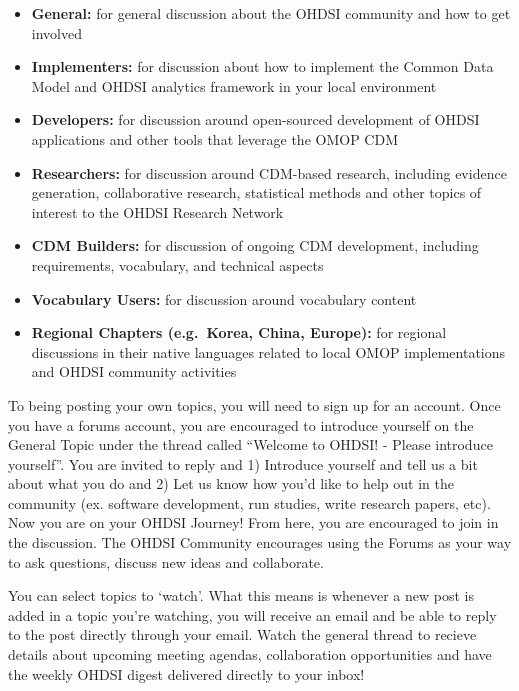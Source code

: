 \documentclass[11pt]{book}
\providecommand{\tightlist}{%
  \setlength{\itemsep}{0pt}\setlength{\parskip}{0pt}}
\theoremstyle{definition}
\theoremstyle{definition}
\theoremstyle{definition}
\theoremstyle{remark}
\let\BeginKnitrBlock\begin \let\EndKnitrBlock\end
\begin{document}
\begin{itemize}
\tightlist
\item
  \textbf{General:} for general discussion about the OHDSI community and how to get involved
\item
  \textbf{Implementers:} for discussion about how to implement the Common Data Model and OHDSI analytics framework in your local environment
\item
  \textbf{Developers:} for discussion around open-sourced development of OHDSI applications and other tools that leverage the OMOP CDM
\item
  \textbf{Researchers:} for discussion around CDM-based research, including evidence generation, collaborative research, statistical methods and other topics of interest to the OHDSI Research Network
\item
  \textbf{CDM Builders:} for discussion of ongoing CDM development, including requirements, vocabulary, and technical aspects
\item
  \textbf{Vocabulary Users:} for discussion around vocabulary content
\item
  \textbf{Regional Chapters (e.g.~Korea, China, Europe):} for regional discussions in their native languages related to local OMOP implementations and OHDSI community activities
\end{itemize}

To being posting your own topics, you will need to sign up for an account. Once you have a forums account, you are encouraged to introduce yourself on the General Topic under the thread called ``Welcome to OHDSI! - Please introduce yourself''. You are invited to reply and 1) Introduce yourself and tell us a bit about what you do and 2) Let us know how you'd like to help out in the community (ex. software development, run studies, write research papers, etc). Now you are on your OHDSI Journey! From here, you are encouraged to join in the discussion. The OHDSI Community encourages using the Forums as your way to ask questions, discuss new ideas and collaborate. 

\BeginKnitrBlock{rmdimportant}
You can select topics to `watch'. What this means is whenever a new post is added in a topic you're watching, you will receive an email and be able to reply to the post directly through your email. Watch the general thread to recieve details about upcoming meeting agendas, collaboration opportunities and have the weekly OHDSI digest delivered directly to your inbox!
\EndKnitrBlock{rmdimportant}
\end{document}
